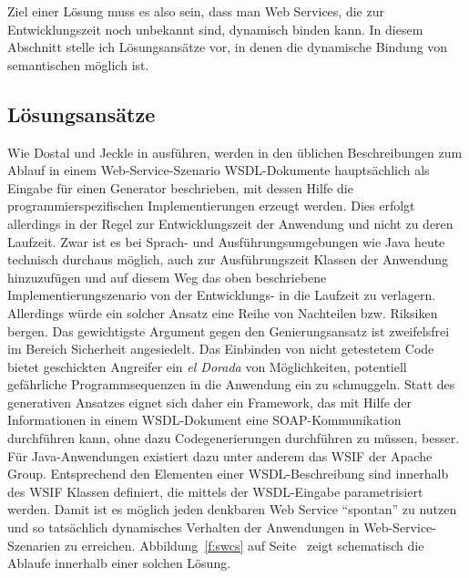 Ziel einer Lösung muss es also sein, dass man Web Services, die zur Entwicklungszeit noch unbekannt sind, dynamisch binden kann. In diesem Abschnitt stelle ich Lösungsansätze vor, in denen die dynamische Bindung von semantischen \ws möglich ist.

\subsection{Lösungsansätze}

Wie Dostal und Jeckle in \cite[S.61]{xmlspek4} ausführen, werden in den üblichen Beschreibungen zum Ablauf in einem Web-Service-Szenario \ac{WSDL}-Dokumente hauptsächlich als Eingabe für einen Generator beschrieben, mit dessen Hilfe die programmierspezifischen Implementierungen erzeugt werden. Dies erfolgt allerdings in der Regel zur Entwicklungszeit der Anwendung und nicht zu deren Laufzeit. Zwar ist es bei Sprach- und Ausführungsumgebungen wie Java heute technisch durchaus möglich, auch zur Ausführungszeit Klassen der Anwendung hinzuzufügen und auf diesem Weg das oben beschriebene Implementierungszenario von der Entwicklungs- in die Laufzeit zu verlagern. Allerdings würde ein solcher Ansatz eine Reihe von Nachteilen bzw. Riksiken bergen. Das gewichtigste Argument gegen den Genierungsansatz ist zweifelsfrei im Bereich Sicherheit angesiedelt. Das Einbinden von nicht getestetem Code bietet geschickten Angreifer ein \emph{el Dorada} von Möglichkeiten, potentiell gefährliche Programmsequenzen in die Anwendung ein zu schmuggeln. Statt des generativen Ansatzes eignet sich daher ein Framework, das mit Hilfe der Informationen in einem \ac{WSDL}-Dokument eine \ac{SOAP}-Kommunikation durchführen kann, ohne dazu Codegenerierungen durchführen zu müssen, besser. Für Java-Anwendungen existiert dazu unter anderem das \ac{WSIF} der Apache Group. Entsprechend den Elementen einer WSDL-Beschreibung sind innerhalb des \ac{WSIF} Klassen definiert, die mittels der \ac{WSDL}-Eingabe parametrisiert werden. Damit ist es möglich jeden denkbaren Web Service "`spontan"' zu nutzen und so tatsächlich dynamisches Verhalten der Anwendungen in Web-Service-Szenarien zu erreichen. Abbildung~\ref{f:swcs} auf Seite~\pageref{f:swcs} zeigt schematisch die Ablaufe innerhalb einer solchen Lösung.


